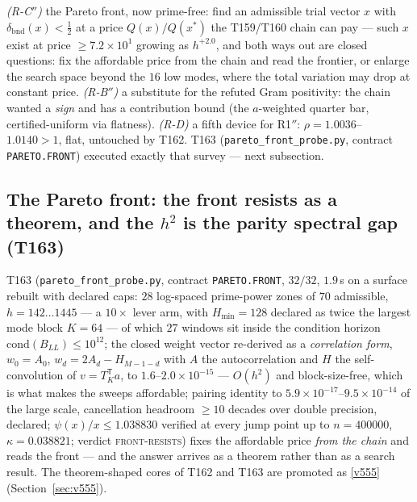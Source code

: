 \documentclass[11pt,a4paper]{article}
\begin{document}
\begin{keybox}
\emph{(R-C$''$)} the Pareto front, now prime-free: find an admissible trial
vector $x$ with $\delta_{\mathrm{bnd}}(x)<\tfrac12$ at a price $Q(x)/Q(x^*)$
the T159/T160 chain can pay --- such $x$ exist at price
$\ge7.2\times10^{1}$ growing as $h^{+2.0}$, and both ways out are closed
questions: fix the affordable price from the chain and read the frontier, or
enlarge the search space beyond the $16$ low modes, where the total variation
may drop at constant price. \emph{(R-B$''$)} a substitute for the refuted Gram
positivity: the chain wanted a \emph{sign} and has a contribution bound (the
$a$-weighted quarter bar, certified-uniform via flatness). \emph{(R-D)} a
fifth device for R1$''$: $\rho=1.0036$--$1.0140>1$, flat, untouched by T162.
T163 (\texttt{pareto\_front\_probe.py}, contract \texttt{PARETO.FRONT}) executed
exactly that survey --- next subsection.
\end{keybox}

\subsection{The Pareto front: the front resists as a theorem, and the $h^2$ is
the parity spectral gap (T163)}
T163 (\texttt{pareto\_front\_probe.py}, contract \texttt{PARETO.FRONT}, $32/32$,
$1.9$\,s on a surface rebuilt with declared caps: $28$ log-spaced prime-power
zones of $70$ admissible, $h=142\ldots1445$ --- a $10\times$ lever arm, with
$H_{\min}=128$ declared as twice the largest mode block $K=64$ --- of which
$27$ windows sit inside the condition horizon
$\mathrm{cond}(B_{LL})\le10^{12}$; the closed weight vector re-derived as a
\emph{correlation form}, $w_0=A_0$, $w_d=2A_d-H_{M-1-d}$ with $A$ the
autocorrelation and $H$ the self-convolution of $v=T_K^{\mathsf T}a$, to
$1.6$--$2.0\times10^{-15}$ --- $O(h^2)$ and block-size-free, which is what
makes the sweeps affordable; pairing identity to
$5.9\times10^{-17}$--$9.5\times10^{-14}$ of the large scale, cancellation
headroom $\ge10$ decades over double precision, declared;
$\psi(x)/x\le1.038830$ verified at every jump point up to $n=400000$,
$\kappa=0.038821$; verdict \textsc{front-resists}) fixes the affordable price
\emph{from the chain} and reads the front --- and the answer arrives as a
theorem rather than as a search result. The theorem-shaped cores of T162 and
T163 are promoted as \vref{v555} 
(Section~\ref{sec:v555}).
\end{document}
